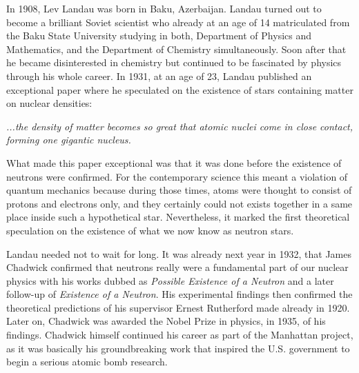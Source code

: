 In 1908, Lev Landau was born in Baku, Azerbaijan.
Landau turned out to become a brilliant Soviet scientist who already at an age of 14 matriculated from the Baku State University studying in both, Department of Physics and Mathematics, and the Department of Chemistry simultaneously.
Soon after that he became disinterested in chemistry but continued to be fascinated by physics through his whole career.
In 1931, at an age of 23, Landau published an exceptional paper where he speculated on the existence of stars containing matter on nuclear densities:\cite{Landau32}
\begin{displayquote}
    \textit{...the density of matter becomes so great that atomic nuclei come in close contact, forming one gigantic nucleus.}
\end{displayquote}
What made this paper exceptional was that it was done before the existence of neutrons were confirmed. 
For the contemporary science this meant a violation of quantum mechanics because during those times, atoms were thought to consist of protons and electrons only, and they certainly could not exists together in a same place inside such a hypothetical star.
Nevertheless, it marked the first theoretical speculation on the existence of what we now know as neutron stars.

Landau needed not to wait for long.
It was already next year in 1932, that James Chadwick confirmed that neutrons really were a fundamental part of our nuclear physics with his works dubbed as \textit{Possible Existence of a Neutron}\cite{Chadwick32a} and a later follow-up of \textit{Existence of a Neutron}\cite{Chadwick32b}.
His experimental findings then confirmed the theoretical predictions of his supervisor Ernest Rutherford made already in 1920\cite{Rutherford20}.
Later on, Chadwick was awarded the Nobel Prize in physics, in 1935, of his findings.
Chadwick himself continued his career as part of the Manhattan project, as it was basically his groundbreaking work that inspired the U.S. government to begin a serious atomic bomb research.


